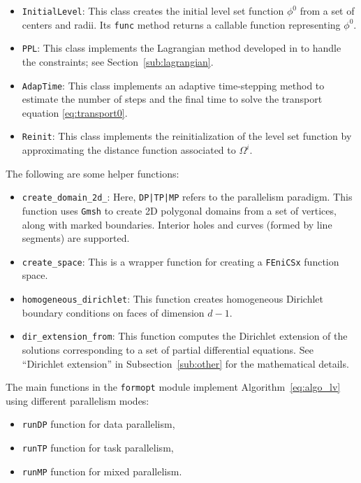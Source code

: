 \documentclass[preprint,9pt]{elsarticle}
\begin{document}
\begin{itemize}
\item \texttt{InitialLevel}:
This class creates the initial level set function $\phi^0$
from a set of centers and radii.
Its \texttt{func} method returns a callable function representing $\phi^0$.

\item \texttt{PPL}:
This class implements the Lagrangian method developed in \cite{MR4589221}
to handle the constraints; see Section~\ref{sub:lagrangian}.

\item \texttt{AdapTime}:
This class implements an adaptive time-stepping method to
estimate the number of steps and the final time to
solve the transport equation \eqref{eq:transport0}.

\item \texttt{Reinit}:
This class implements the reinitialization of the level set function
by approximating the distance function associated to $\Omega^i$.
\end{itemize}

The following are some helper functions:
\begin{itemize}
\item \texttt{create\_domain\_2d\_<DP|TP|MP>}:
Here, \texttt{DP|TP|MP} refers to the parallelism paradigm.
This function uses \texttt{Gmsh} to create 2D polygonal domains 
from a set of vertices, along with marked boundaries.
Interior holes and curves (formed by line segments) are supported.

\item \texttt{create\_space}:
This is a wrapper function for creating a \texttt{FEniCSx} function space.

\item \texttt{homogeneous\_dirichlet}:
This function creates homogeneous Dirichlet boundary conditions
on faces of dimension $d-1$.

\item \texttt{dir\_extension\_from}:
This function computes the Dirichlet extension of the solutions
corresponding to a set of partial differential equations.
See ``Dirichlet extension'' in Subsection~\ref{sub:other} for
the mathematical details.
\end{itemize}

The main functions in the \texttt{formopt} module
implement Algorithm~\ref{eq:algo_lv} using
different parallelism modes:
\begin{itemize}
\item \texttt{runDP} function for data parallelism,
\item \texttt{runTP} function for task parallelism, 
\item \texttt{runMP} function for mixed parallelism.
\end{itemize}
\end{document}
